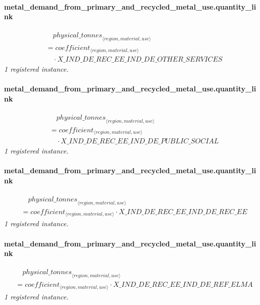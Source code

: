 \documentclass[11pt]{article}
\begin{document}
\paragraph{metal\_demand\_from\_primary\_and\_recycled\_metal\_use.quantity\_link}
\begin{align*}
&\quad {physical\_tonnes}_{\langle region, material, use\rangle}\\
&= coefficient_{\langle region, material, use\rangle}\\
&\quad {}\cdot X\_IND\_DE\_REC\_EE\_IND\_DE\_OTHER\_SERVICES
\end{align*}
\noindent\emph{1 registered instance.}\par
\paragraph{metal\_demand\_from\_primary\_and\_recycled\_metal\_use.quantity\_link}
\begin{align*}
&\quad {physical\_tonnes}_{\langle region, material, use\rangle}\\
&= coefficient_{\langle region, material, use\rangle}\\
&\quad {}\cdot X\_IND\_DE\_REC\_EE\_IND\_DE\_PUBLIC\_SOCIAL
\end{align*}
\noindent\emph{1 registered instance.}\par
\paragraph{metal\_demand\_from\_primary\_and\_recycled\_metal\_use.quantity\_link}
\begin{align*}
&\quad {physical\_tonnes}_{\langle region, material, use\rangle}\\
&= coefficient_{\langle region, material, use\rangle} \cdot X\_IND\_DE\_REC\_EE\_IND\_DE\_REC\_EE
\end{align*}
\noindent\emph{1 registered instance.}\par
\paragraph{metal\_demand\_from\_primary\_and\_recycled\_metal\_use.quantity\_link}
\begin{align*}
&\quad {physical\_tonnes}_{\langle region, material, use\rangle}\\
&= coefficient_{\langle region, material, use\rangle} \cdot X\_IND\_DE\_REC\_EE\_IND\_DE\_REF\_ELMA
\end{align*}
\noindent\emph{1 registered instance.}\par
\end{document}
